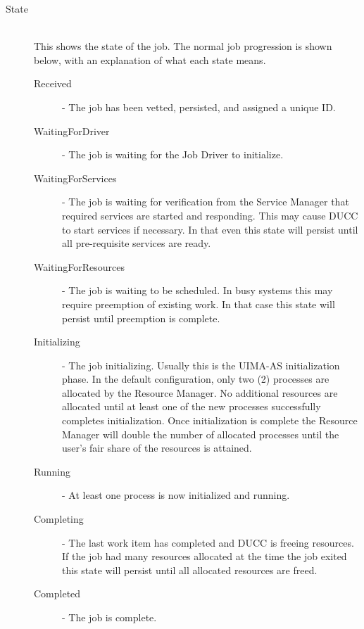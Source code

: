 \begin{description}
            \item[State] \hfill \\
              This shows the state of the job.  The normal job progression is shown below, with an
              explanation of what each state means.
              \begin{description}
                  \item[Received] - The job has been vetted, persisted, and assigned a unique ID. 
                  \item[WaitingForDriver] - The job is waiting for the Job Driver to initialize. 
                  \item[WaitingForServices] - The job is waiting for verification from the
                    Service Manager that required services are started and responding.  This may
                    cause DUCC to start services if necessary.  In that even this state will
                    persist until all pre-requisite services are ready.
                  \item[WaitingForResources] - The job is waiting to be scheduled. In busy
                    systems this may require preemption of existing work.  In that case this
                    state will persist until preemption is complete.
                  \item[Initializing] - The job initializing. Usually this
                    is the UIMA-AS initialization phase.  In the default configuration, only
                    two (2) processes are allocated by the Resource Manager.  No additional
                    resources are allocated until at least one of the new processes successfully
                    completes initialization.  Once initialization is complete the Resource Manager
                    will double the number of allocated processes until the user's fair share of
                    the resources is attained.
                  \item[Running] - At least one process is now initialized and running. 
                  \item[Completing] - The last work item has completed and DUCC is freeing resources.
                    If the job had many resources allocated at the time the job exited this state
                    will persist until all allocated resources are freed.
                  \item[Completed] - The job is complete. 
              \end{description}
                  

\end{description}
